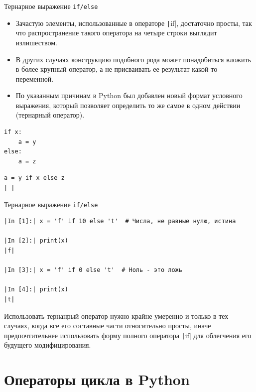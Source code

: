 \documentclass[aspectratio=169]{beamer}	%
\begin{document}
\begin{frame}[fragile]{Тернарное выражение \texttt{if/else}}
\scriptsize
\begin{itemize}
	\item Зачастую элементы, использованные в операторе \texttt|if|, достаточно просты, так что распространение такого оператора на четыре строки выглядит излишеством.
	
	\item В других случаях конструкцию подобного рода может понадобиться вложить в более крупный оператор, а не присваивать ее результат какой-то переменной.
	
	\item По указанным причинам в Python был добавлен новый формат условного выражения, который позволяет определить то же самое в одном действии (тернарный оператор).
\end{itemize}

\begin{multicols}{2}

\begin{verbatim}
if x:
    a = y
else:
    a = z
\end{verbatim}

\columnbreak

\begin{verbatim}
a = y if x else z
| |
\end{verbatim}
\end{multicols}
\vfill
\end{frame}


\begin{frame}[fragile]{Тернарное выражение \texttt{if/else}}
\scriptsize
\begin{verbatim}
|In [1]:| x = 'f' if 10 else 't'  # Числа, не равные нулю, истина

|In [2]:| print(x)
|f|

|In [3]:| x = 'f' if 0 else 't'  # Ноль - это ложь

|In [4]:| print(x)
|t|
\end{verbatim}
Использовать тернанрый оператор нужно крайне умеренно и только в тех случаях, когда все его составные части относительно просты, иначе предпочтительнее использовать форму полного оператора \texttt|if| для облегчения его  будущего модифицирования.
\vfill
\end{frame}


\section{Операторы цикла в Python}
\sectionframe
\end{document}
